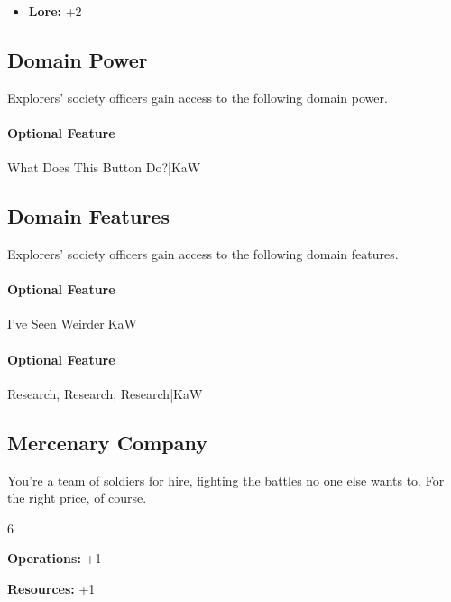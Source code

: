 \documentclass[10pt,a4paper,twoside,bg=print,twocolumn,openany,nodeprecatedcode]{dndbook}
\begin{document}
{\par \vspace { 9pt plus 3pt minus 3pt } \noindent  {} \nopagebreak }

\begin{itemize}
\item \textbf{Lore:} +2
\end{itemize}

\subsection{Domain Power}
Explorers' society officers gain access to the following domain power.

\paragraph{Optional Feature}
What Does This Button Do?|KaW

\subsection{Domain Features}
Explorers' society officers gain access to the following domain features.

\paragraph{Optional Feature}
I've Seen Weirder|KaW

\paragraph{Optional Feature}
Research, Research, Research|KaW

\subsection{Mercenary Company}
You're a team of soldiers for hire, fighting the battles no one else wants to. For the right price, of course.

{\par \vspace { 9pt plus 3pt minus 3pt } \noindent  {} \nopagebreak }

\begin{itemize}
\begin{multicols}{6}
\item \textbf{Operations:} +1
\item \textbf{Resources:} +1
\end{multicols}

\end{itemize}
\end{document}
